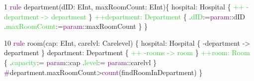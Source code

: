 {

1\hspace{0.5cm} \textcolor{Purple}{rule} department(dID: EInt, maxRoomCount: EInt)\{\hspace{1cm}	hospital: Hospital \{\hspace{1.5cm}	\textcolor{LimeGreen}{++ -department -> department} \hspace{1cm}	\}\hspace{1cm}   \textcolor{LimeGreen}{++department: Department} \{ \hspace{1.5cm}	    .\textcolor{LimeGreen}{dID}:=\textcolor{Purple}{param}::dID \hspace{1.5cm}	    .\textcolor{LimeGreen}{maxRoomCount}:=\textcolor{Purple}{param}::maxRoomCount \hspace{1cm}		\} \hspace{0.5cm}\} \newline\newline

10\hspace{0.5cm} \textcolor{Purple}{rule} room(cap: EInt, carelvl: Carelevel) \{ \hspace{1cm}		hospital: Hospital \{ \hspace{1.5cm}			-department -> department \hspace{1cm}		\} \hspace{1cm}		department: Department \{ \hspace{1.5cm}\textcolor{LimeGreen}{++ -rooms -> room} \hspace{1cm}	\} \hspace{1cm}	\textcolor{LimeGreen}{++room: Room} \{ \hspace{1.5cm}	.\textcolor{LimeGreen}{capacity}:= \textcolor{Purple}{param}::cap \hspace{1.5cm}	.\textcolor{LimeGreen}{level}:= \textcolor{Purple}{param}::carelvl \hspace{1cm}\} \hspace{1cm}	\textcolor{Purple}{\#}department.maxRoomCount>\textcolor{Purple}{count}(findRoomInDepartment) \hspace{0.5cm}\} \newline\newline

}

